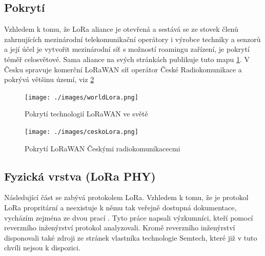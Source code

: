 \documentclass{ctuthesis}
\begin{document}
\subsection{Pokrytí}
Vzhledem k tomu, že LoRa aliance je otevřená a sestává se ze stovek členů zahrnujících mezinárodní telekomunikační operátory i výrobce techniky a senzorů a její účel je vytvořit mezinárodní síť s možností roamingu zařízení, je pokrytí téměř celosvětové. Sama aliance na svých stránkách publikuje tuto mapu \ref{worldLora}. V Česku spravuje komerční LoRaWAN síť operátor České Radiokomunikace a pokrývá většinu území, viz \ref{ceskoLora}
\begin{figure}
\caption{Pokrytí technologií LoRaWAN ve světě \cite{loraalliance}}
\texttt{[image: ./images/worldLora.png]}
\label{worldLora}
\end{figure}
\begin{figure}
\caption{Pokrytí LoRaWAN Českými radiokomunikacecmi \cite{cralora}}
\texttt{[image: ./images/ceskoLora.png]}
\label{ceskoLora}
\end{figure}
\subsection{Fyzická vrstva (LoRa PHY)}
Následující část se zabývá protokolem LoRa. Vzhledem k tomu, že je protokol LoRa propritární a neexistuje k němu tak veřejně dostupná dokumentace, vycházím zejména ze dvou prací \cite{gr-lora2016} \cite{gr-lora2018}. Tyto práce napsali výzkumníci, kteří pomocí reverzního inženýrství protokol analyzovali. Kromě reverzního inženýrství disponovali také zdroji ze stránek vlastníka technologie Semtech, které již v tuto chvíli nejsou k dispozici.
\end{document}
